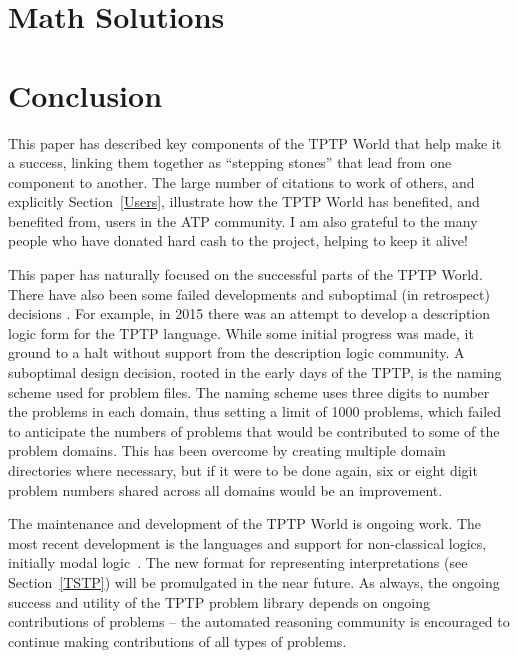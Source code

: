 \documentclass[runningheads]{llncs}
\begin{document}
\section{Math Solutions}
\label{MathSolutions}

\section{Conclusion}
\label{Conclusion}

This paper has described key components of the TPTP World that help make it a success,
linking them together as ``stepping stones'' that lead from one component to another.
The large number of citations to work of others, and explicitly Section~\ref{Users}, 
illustrate how the TPTP World has benefited, and benefited from, users in the ATP community.
I am also grateful to the many people who have donated hard cash to the project, helping
to keep it alive!

This paper has naturally focused on the successful parts of the TPTP World.
There have also been some failed developments and suboptimal (in retrospect) decisions \frownie{}.
For example, in 2015 there was an attempt to develop a description logic form for the TPTP 
language. 
While some initial progress was made, it ground to a halt without support from the description 
logic community.
A suboptimal design decision, rooted in the early days of the TPTP, is the naming scheme used for 
problem files. 
The naming scheme uses three digits to number the problems in each domain, thus setting a limit 
of 1000 problems, which failed to anticipate the numbers of problems that would be contributed 
to some of the problem domains.
This has been overcome by creating multiple domain directories where necessary, but if it were 
to be done again, six or eight digit problem numbers shared across all domains would be an 
improvement.

The maintenance and development of the TPTP World is ongoing work.
The most recent development is the languages and support for non-classical logics, initially
modal logic~\cite{SF+22,SS24}.
The new format for representing interpretations (see Section~\ref{TSTP}) will be promulgated in 
the near future.
As always, the ongoing success and utility of the TPTP problem library depends on ongoing 
contributions of problems -- the automated reasoning community is encouraged to continue making 
contributions of all types of problems.
\end{document}
